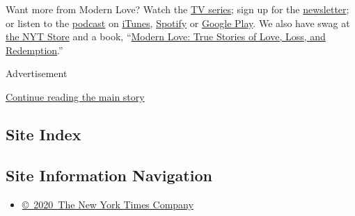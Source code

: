 Want more from Modern Love? Watch the
\href{https://www.nytimes.com/2019/09/12/style/modern-love-tv-show-trailer.html}{TV
series}; sign up for the
\href{https://www.nytimes.com/newsletters/love-letter}{newsletter}; or
listen to the
\href{https://www.nytimes.com/column/modern-love-podcast}{podcast} on
\href{https://itunes.apple.com/us/podcast/modern-love/id1065559535?mt=2\&version=meter+at+0\&module=meter-Links\&pgtype=article\&contentId=\&mediaId=\&referrer=\&priority=true\&action=click\&contentCollection=meter-links-click}{iTunes},
\href{https://open.spotify.com/show/03Er7mSPq9IEewOgbPD3vO}{Spotify} or
\href{https://play.google.com/music/listen?u=0\#/ps/Iktqjbkz7bychbnofblw32dik64}{Google
Play}. We also have swag at
\href{https://store.nytimes.com/collections/modern-love}{the NYT Store}
and a book,
``\href{https://www.penguinrandomhouse.com/books/623036/modern-love-revised-and-updated-by-edited-by-daniel-jones-with-contributions-by-andrew-rannells-ayelet-waldman-amy-krouse-rosenthal-veronica-chambers-and-more/}{Modern
Love: True Stories of Love, Loss, and Redemption}.''

Advertisement

\protect\hyperlink{after-bottom}{Continue reading the main story}

\hypertarget{site-index}{%
\subsection{Site Index}\label{site-index}}

\hypertarget{site-information-navigation}{%
\subsection{Site Information
Navigation}\label{site-information-navigation}}

\begin{itemize}
\tightlist
\item
  \href{https://help.nytimes.com/hc/en-us/articles/115014792127-Copyright-notice}{©~2020~The
  New York Times Company}
\end{itemize}

